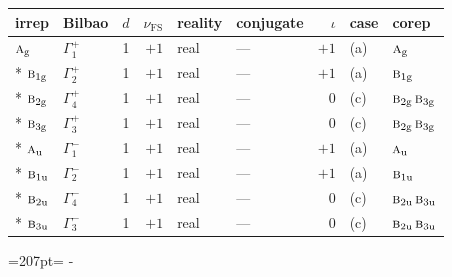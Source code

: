 \documentclass[10pt,a4paper]{article}
\newcommand{\needspace}[1]{\par\penalty-100\begingroup\dimen0=#1\relax\dimen2=\pagegoal
  \advance\dimen2-\pagetotal\ifdim\dimen0>\dimen2\relax\ifdim\dimen2>0pt\vfil\break\fi\fi
  \endgroup}
\numberwithin{equation}{section}
\newcommand{\irr}[1]{\text{\normalfont\scshape #1}}
\newcommand{\ptag}[1]{\mathrm{#1}}
\newcommand{\fsind}{\nu_{\mathrm{FS}}}
\begin{document}
{\small\renewcommand{\arraystretch}{1.25}\setlength{\tabcolsep}{4pt}\begin{longtable}{@{}llrrllrll@{}}\toprule
irrep & Bilbao & $d$ & $\fsind$ & reality & conjugate & $\iota$ & case & corep\\\midrule\endhead
\bottomrule\endfoot\endlastfoot
$\irr{a}_{\ptag{g}}$ & $\Gamma_{1}^{+}$ & 1 & $+1$ & real & --- & $+1$ & (a) & $\irr{a}_{\ptag{g}}$\\*
$\irr{b}_{1\ptag{g}}$ & $\Gamma_{2}^{+}$ & 1 & $+1$ & real & --- & $+1$ & (a) & $\irr{b}_{1\ptag{g}}$\\*
$\irr{b}_{2\ptag{g}}$ & $\Gamma_{4}^{+}$ & 1 & $+1$ & real & --- & $0$ & (c) & $\irr{b}_{2\ptag{g}}\,\irr{b}_{3\ptag{g}}$\\*
$\irr{b}_{3\ptag{g}}$ & $\Gamma_{3}^{+}$ & 1 & $+1$ & real & --- & $0$ & (c) & $\irr{b}_{2\ptag{g}}\,\irr{b}_{3\ptag{g}}$\\*
$\irr{a}_{\ptag{u}}$ & $\Gamma_{1}^{-}$ & 1 & $+1$ & real & --- & $+1$ & (a) & $\irr{a}_{\ptag{u}}$\\*
$\irr{b}_{1\ptag{u}}$ & $\Gamma_{2}^{-}$ & 1 & $+1$ & real & --- & $+1$ & (a) & $\irr{b}_{1\ptag{u}}$\\*
$\irr{b}_{2\ptag{u}}$ & $\Gamma_{4}^{-}$ & 1 & $+1$ & real & --- & $0$ & (c) & $\irr{b}_{2\ptag{u}}\,\irr{b}_{3\ptag{u}}$\\*
$\irr{b}_{3\ptag{u}}$ & $\Gamma_{3}^{-}$ & 1 & $+1$ & real & --- & $0$ & (c) & $\irr{b}_{2\ptag{u}}\,\irr{b}_{3\ptag{u}}$\\
\bottomrule\end{longtable}}
\needspace{207pt}
\end{document}
